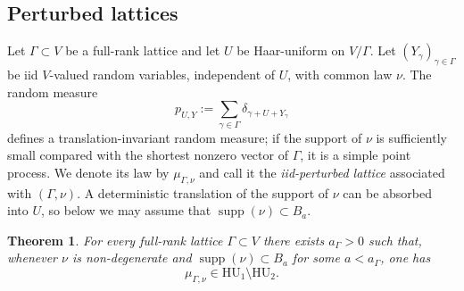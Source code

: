 \documentclass[11pt,reqno,a4paper]{amsart}
\numberwithin{equation}{section}
\theoremstyle{compact}
\newtheorem{theorem}{Theorem}[section]
\theoremstyle{definition}
\theoremstyle{definition}
\newcommand{\HU}{\mathrm{HU}}
\begin{document}
\subsection{Perturbed lattices}
\label{subsec:perturbed-lattices}

Let $\Gamma\subset V$ be a full-rank lattice and let $U$ be Haar-uniform on
$V/\Gamma$.  Let $(Y_\gamma)_{\gamma\in\Gamma}$ be iid $V$-valued random
variables, independent of $U$, with common law $\nu$.  The random measure
\begin{equation}\label{eq:iid-perturbed-lattice}
  p_{U,Y}:=\sum_{\gamma\in\Gamma}
     \delta_{\gamma+U+Y_\gamma}
\end{equation}
defines a translation-invariant random measure; if the support of $\nu$ is
sufficiently small compared with the shortest nonzero vector of $\Gamma$,
it is a simple point process.  We denote its law by $\mu_{\Gamma,\nu}$ and
call it the \emph{iid-perturbed lattice} associated with $(\Gamma,\nu)$.
A deterministic translation of the support of $\nu$ can be absorbed into
$U$, so below we may assume that $\operatorname{supp}(\nu)\subset B_a$.

\begin{theorem}\label{thm:perturbed-lattice-separation}
For every full-rank lattice $\Gamma\subset V$ there exists $a_\Gamma>0$ such
that, whenever $\nu$ is non-degenerate and
$\operatorname{supp}(\nu)\subset B_a$ for some $a<a_\Gamma$, one has
\[
  \mu_{\Gamma,\nu}\in\HU_1\setminus\HU_2.
\]
\end{theorem}
\end{document}
